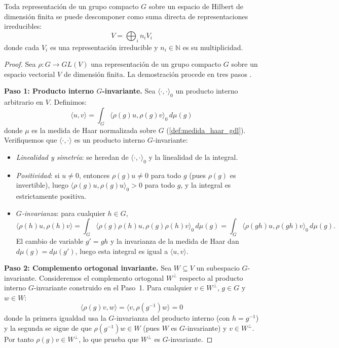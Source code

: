 \begin{theorem}\label{thm:descomposicion_representaciones}
Toda representación de un grupo compacto $G$ sobre un espacio de Hilbert de dimensión finita se puede descomponer como suma directa de representaciones irreducibles:
\begin{equation}
V = \bigoplus_{i} n_i V_i
\end{equation}
donde cada $V_i$ es una representación irreducible y $n_i \in \mathbb{N}$ es su multiplicidad.
\end{theorem}

\begin{proof}
Sea $\rho: G \rightarrow GL(V)$ una representación de un grupo compacto $G$ sobre un espacio vectorial $V$ de dimensión finita. La demostración procede en tres pasos \citep{Fulton1991}.

\textbf{Paso 1: Producto interno $G$-invariante.}
Sea $\langle \cdot, \cdot \rangle_0$ un producto interno arbitrario en $V$. Definimos:
\begin{equation}\label{eq:producto_invariante}
\langle u, v \rangle = \int_G \langle \rho(g)u, \rho(g)v \rangle_0 \, d\mu(g)
\end{equation}
donde $\mu$ es la medida de Haar normalizada sobre $G$ (\autoref{def:medida_haar_gdl}). Verifiquemos que $\langle \cdot, \cdot \rangle$ es un producto interno $G$-invariante:
\begin{itemize}
    \item \textit{Linealidad y simetría}: se heredan de $\langle \cdot, \cdot \rangle_0$ y la linealidad de la integral.
    \item \textit{Positividad}: si $u \neq 0$, entonces $\rho(g)u \neq 0$ para todo $g$ (pues $\rho(g)$ es invertible), luego $\langle \rho(g)u, \rho(g)u \rangle_0 > 0$ para todo $g$, y la integral es estrictamente positiva.
    \item \textit{$G$-invarianza}: para cualquier $h \in G$,
    \[
    \langle \rho(h)u, \rho(h)v \rangle = \int_G \langle \rho(g)\rho(h)u, \rho(g)\rho(h)v \rangle_0 \, d\mu(g) = \int_G \langle \rho(gh)u, \rho(gh)v \rangle_0 \, d\mu(g).
    \]
    El cambio de variable $g' = gh$ y la invarianza de la medida de Haar dan $d\mu(g) = d\mu(g')$, luego esta integral es igual a $\langle u, v \rangle$.
\end{itemize}

\textbf{Paso 2: Complemento ortogonal invariante.}
Sea $W \subseteq V$ un subespacio $G$-invariante. Consideremos el complemento ortogonal $W^\perp$ respecto al producto interno $G$-invariante construido en el Paso~1. Para cualquier $v \in W^\perp$, $g \in G$ y $w \in W$:
\[
\langle \rho(g)v, w \rangle = \langle v, \rho(g^{-1})w \rangle = 0
\]
donde la primera igualdad usa la $G$-invarianza del producto interno (con $h = g^{-1}$) y la segunda se sigue de que $\rho(g^{-1})w \in W$ (pues $W$ es $G$-invariante) y $v \in W^\perp$. Por tanto $\rho(g)v \in W^\perp$, lo que prueba que $W^\perp$ es $G$-invariante.


\end{proof}
